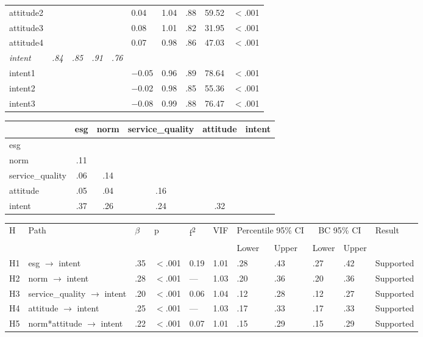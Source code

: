\documentclass{article}
\begin{document}
\begin{tabular}{llllllllll}
\quad attitude2 &  &  &  &  & 0.04 & 1.04 & .88 & 59.52 & $<$.001 \\
\quad attitude3 &  &  &  &  & 0.08 & 1.01 & .82 & 31.95 & $<$.001 \\
\quad attitude4 &  &  &  &  & 0.07 & 0.98 & .86 & 47.03 & $<$.001 \\
\textit{intent} & \textit{.84} & \textit{.85} & \textit{.91} & \textit{.76} & \textit{} & \textit{} & \textit{} & \textit{} & \textit{} \\
\quad intent1 &  &  &  &  & $-$0.05 & 0.96 & .89 & 78.64 & $<$.001 \\
\quad intent2 &  &  &  &  & $-$0.02 & 0.98 & .85 & 55.36 & $<$.001 \\
\quad intent3 &  &  &  &  & $-$0.08 & 0.99 & .88 & 76.47 & $<$.001 \\
\bottomrule
\end{tabular}

\begin{tabular}{lccccc}
\toprule
 & esg & norm & service\_quality & attitude & intent \\
\midrule
esg &  &  &  &  &  \\
norm & .11 &  &  &  &  \\
service\_quality & .06 & .14 &  &  &  \\
attitude & .05 & .04 & .16 &  &  \\
intent & .37 & .26 & .24 & .32 &  \\
\bottomrule
\end{tabular}

\begin{tabular}{lllllllllll}
\toprule
H & Path & $\beta$ & p & f\textsuperscript{2} & VIF & \multicolumn{2}{c}{Percentile 95\% CI} & \multicolumn{2}{c}{BC 95\% CI} & Result \\
\cmidrule(lr){7-8} \cmidrule(lr){9-10}
 &  &  &  &  &  & Lower & Upper & Lower & Upper &  \\
\midrule
H1 & esg $\rightarrow$ intent & .35 & $<$.001 & 0.19 & 1.01 & .28 & .43 & .27 & .42 & Supported \\
H2 & norm $\rightarrow$ intent & .28 & $<$.001 & --- & 1.03 & .20 & .36 & .20 & .36 & Supported \\
H3 & service\_quality $\rightarrow$ intent & .20 & $<$.001 & 0.06 & 1.04 & .12 & .28 & .12 & .27 & Supported \\
H4 & attitude $\rightarrow$ intent & .25 & $<$.001 & --- & 1.03 & .17 & .33 & .17 & .33 & Supported \\
H5 & norm*attitude $\rightarrow$ intent & .22 & $<$.001 & 0.07 & 1.01 & .15 & .29 & .15 & .29 & Supported \\
\bottomrule
\end{tabular}
\end{document}

